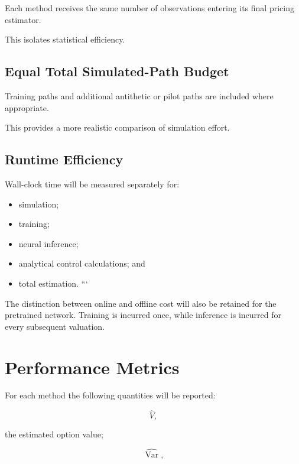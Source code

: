 \documentclass[12pt,a4paper]{report}
\begin{document}
Each method receives the same number of observations entering its final pricing estimator.

This isolates statistical efficiency.

\subsection{Equal Total Simulated-Path Budget}

Training paths and additional antithetic or pilot paths are included where appropriate.

This provides a more realistic comparison of simulation effort.

\subsection{Runtime Efficiency}

Wall-clock time will be measured separately for:

\begin{itemize}

```
\item simulation;

\item training;

\item neural inference;

\item analytical control calculations; and

\item total estimation.
```

\end{itemize}

The distinction between online and offline cost will also be retained for the pretrained network. Training is incurred once, while inference is incurred for every subsequent valuation.

\section{Performance Metrics}

For each method the following quantities will be reported:

\begin{equation}
\widehat V,
\end{equation}

the estimated option value;

\begin{equation}
\widehat{\operatorname{Var}},
\end{equation}
\end{document}
